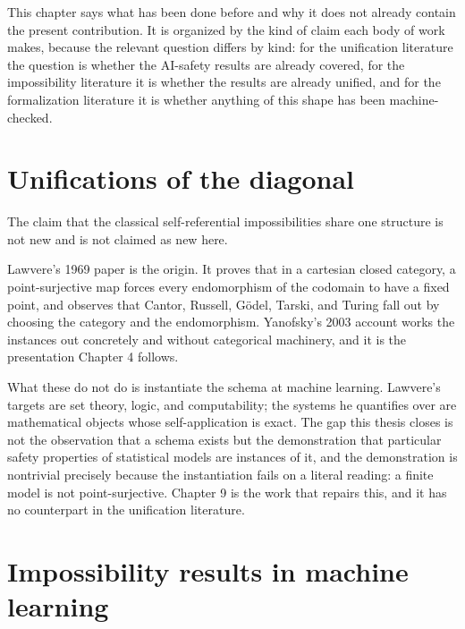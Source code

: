 \documentclass{memoir}
\begin{document}
This chapter says what has been done before and why it does not already contain
the present contribution. It is organized by the kind of claim each body of work
makes, because the relevant question differs by kind: for the unification
literature the question is whether the AI-safety results are already covered,
for the impossibility literature it is whether the results are already unified,
and for the formalization literature it is whether anything of this shape has
been machine-checked.



\section{Unifications of the diagonal}\label{Two--Schemas--of--Impossibility-005F-005F-005F--Machine--Checked--Limits--of--Trustworthy--Machine--Learning-005F-005F-005F--and--Why--They--Tighten--with--Capability----Related--Work--and--Positioning----Unifications--of--the--diagonal}

The claim that the classical self-referential impossibilities share one
structure is not new and is not claimed as new here.

Lawvere's 1969 paper is the origin. It proves that in a cartesian closed
category, a point-surjective map forces every endomorphism of the codomain to
have a fixed point, and observes that Cantor, Russell, Gödel, Tarski, and Turing
fall out by choosing the category and the endomorphism. Yanofsky's 2003 account
works the instances out concretely and without categorical machinery, and it is
the presentation Chapter 4 follows.

What these do not do is instantiate the schema at machine learning. Lawvere's
targets are set theory, logic, and computability; the systems he quantifies over
are mathematical objects whose self-application is exact. The gap this thesis
closes is not the observation that a schema exists but the demonstration that
particular safety properties of statistical models are instances of it, and the
demonstration is nontrivial precisely because the instantiation fails on a
literal reading: a finite model is not point-surjective. Chapter 9 is the work
that repairs this, and it has no counterpart in the unification literature.



\section{Impossibility results in machine learning}\label{Two--Schemas--of--Impossibility-005F-005F-005F--Machine--Checked--Limits--of--Trustworthy--Machine--Learning-005F-005F-005F--and--Why--They--Tighten--with--Capability----Related--Work--and--Positioning----Impossibility--results--in--machine--learning}
\end{document}
